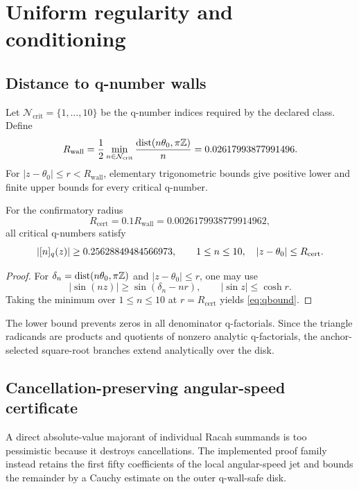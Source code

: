 \section{Uniform regularity and conditioning}
\subsection{Distance to q-number walls}
Let $\mathcal N_{\mathrm{crit}}=\{1,\ldots,10\}$ be the q-number indices required by the declared class.  Define
\begin{equation}
R_{\mathrm{wall}}
=
\frac12\min_{n\in\mathcal N_{\mathrm{crit}}}
\frac{\operatorname{dist}(n\theta_0,\pi\mathbb Z)}{n}
=0.02617993877991496.
\label{eq:Rwall}
\end{equation}
For $|z-\theta_0|\le r<R_{\mathrm{wall}}$, elementary trigonometric bounds give positive lower and finite upper bounds for every critical q-number.

\begin{lemma}
\label{lem:qseparation}
For the confirmatory radius
\begin{equation}
R_{\mathrm{cert}}=0.1R_{\mathrm{wall}}
=0.0026179938779914962,
\label{eq:Rcert}
\end{equation}
all critical q-numbers satisfy
\begin{equation}
|[n]_q(z)|\ge0.25628849484566973,
\qquad
1\le n\le10,
\quad
|z-\theta_0|\le R_{\mathrm{cert}}.
\label{eq:qbound}
\end{equation}
\end{lemma}

\begin{proof}
For $\delta_n=\operatorname{dist}(n\theta_0,\pi\mathbb Z)$ and $|z-\theta_0|\le r$, one may use
\[
|\sin(nz)|\ge \sin(\delta_n-nr),
\qquad
|\sin z|\le\cosh r.
\]
Taking the minimum over $1\le n\le10$ at $r=R_{\mathrm{cert}}$ yields \eqref{eq:qbound}.
\end{proof}

The lower bound prevents zeros in all denominator q-factorials.  Since the triangle radicands are products and quotients of nonzero analytic q-factorials, the anchor-selected square-root branches extend analytically over the disk.

\subsection{Cancellation-preserving angular-speed certificate}
A direct absolute-value majorant of individual Racah summands is too pessimistic because it destroys cancellations.  The implemented proof family instead retains the first fifty coefficients of the local angular-speed jet and bounds the remainder by a Cauchy estimate on the outer q-wall-safe disk.

